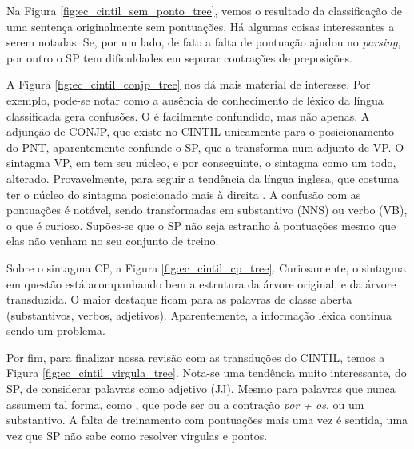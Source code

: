 \begin{center}
    
\end{center}
Na Figura \ref{fig:ec_cintil_sem_ponto_tree}, vemos o resultado da classificação de uma sentença originalmente sem pontuações. Há algumas coisas interessantes a serem notadas. Se, por um lado, de fato a falta de pontuação ajudou no \textit{parsing}, por outro o SP tem dificuldades em separar contrações de preposições.
\begin{center}
    
\end{center}
A Figura \ref{fig:ec_cintil_conjp_tree} nos dá mais material de interesse. Por exemplo, pode-se notar como a ausência de conhecimento de léxico da língua classificada gera confusões. O  é facilmente confundido, mas não apenas. A adjunção de CONJP, que existe no CINTIL unicamente para o posicionamento do PNT, aparentemente confunde o SP, que a transforma num adjunto de VP. O sintagma VP, em  tem seu núcleo, e por conseguinte, o sintagma como um todo, alterado. Provavelmente, para seguir a tendência da língua inglesa, que costuma ter o núcleo do sintagma posicionado mais à direita . A confusão com as pontuações é notável, sendo transformadas em substantivo (NNS) ou verbo (VB), o que é curioso. Supões-se que o SP não seja estranho à pontuações mesmo que elas não venham no seu conjunto de treino.
\begin{center}
    
\end{center}
Sobre o sintagma CP, a Figura \ref{fig:ec_cintil_cp_tree}. Curiosamente, o sintagma em questão está acompanhando bem a estrutura da árvore original, e da árvore transduzida. O maior destaque ficam para as palavras de classe aberta (substantivos, verbos, adjetivos). Aparentemente, a informação léxica continua sendo um problema.
\begin{center}
    
\end{center}
Por fim, para finalizar nossa revisão com as transduções do CINTIL, temos a Figura \ref{fig:ec_cintil_virgula_tree}. Nota-se uma tendência muito interessante, do SP, de considerar palavras como adjetivo (JJ). Mesmo para palavras que nunca assumem tal forma, como , que pode ser ou a contração \textit{por + os}, ou um substantivo. A falta de treinamento com pontuações mais uma vez é sentida, uma vez que SP não sabe como resolver vírgulas e pontos.